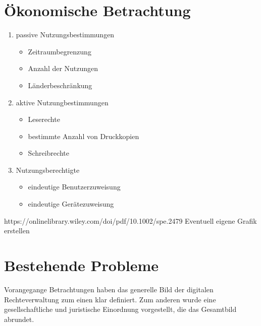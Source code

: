 \begin{spacing}{1.5}
\section{Ökonomische Betrachtung}
\begin{enumerate}
\item passive Nutzungsbestimmungen
	\begin{itemize}
	\item Zeitraumbegrenzung
	\item Anzahl der Nutzungen
	\item Länderbeschränkung
	\end{itemize}
\item aktive Nutzungbestimmungen
	\begin{itemize}
	\item Leserechte
	\item bestimmte Anzahl von Druckkopien
	\item Schreibrechte
	\end{itemize}
\item Nutzungsberechtigte
	\begin{itemize}
	\item eindeutige Benutzerzuweisung
	\item eindeutige Gerätezuweisung
	\end{itemize}
\end{enumerate} 

https://onlinelibrary.wiley.com/doi/pdf/10.1002/spe.2479
Eventuell eigene Grafik erstellen


\label{Ökonomische Betrachtung}

\section{Bestehende Probleme}
\label{sec:Bestehende Probleme}
Vorangegange Betrachtungen haben das generelle Bild der digitalen Rechteverwaltung zum einen klar definiert. Zum anderen wurde eine gesellschaftliche und juristische Einordnung vorgestellt, die das Gesamtbild abrundet. 

\end{spacing}
